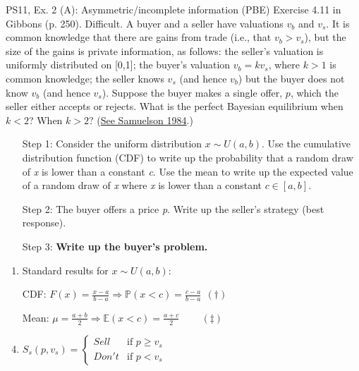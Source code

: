 \begin{frame}{PS11, Ex. 2 (A): Asymmetric/incomplete information (PBE)}
    Exercise 4.11 in Gibbons (p. 250). Difficult. A buyer and a seller have valuations $v_b$ and $v_s$. It is common knowledge that there are gains from trade (i.e., that $v_b > v_s$), but the size of the gains is private information, as follows: the seller’s valuation is uniformly distributed on [0,1]; the buyer’s valuation $v_b = kv_s$, where $k > 1$ is common knowledge; the seller knows $v_s$ (and hence $v_b$) but the buyer does not know $v_b$ (and hence $v_s$). Suppose the buyer makes a single offer, $p$, which the seller either accepts or rejects. What is the perfect Bayesian equilibrium when $k < 2$? When $k > 2$? (\href{https://www.jstor.org/stable/1911195}{See Samuelson 1984}.) \vspace{-8pt}
    \begin{multicols}{2}
      \begin{itemize}
        \item[Step 1:] Consider the uniform distribution $x\sim U(a, b)$. Use the cumulative distribution function (CDF) to write up the probability that a random draw of \textit{x} is lower than a constant \textit{c}. Use the mean to write up the expected value of a random draw of \textit{x} where \textit{x} is lower than a constant $c\in[a,b]$.
        \item[Step 2:] The buyer offers a price \textit{p}. Write up the seller's strategy (best response).
        \item[Step 3:] \textbf{Write up the buyer's problem.}
      \end{itemize}
      \vfill\null\columnbreak
      \begin{enumerate}
        \item Standard results for $x\sim U(a, b):$
        \item[CDF:] $F(x)=\frac{x-a}{b-a}\Rightarrow\mathbb{P}(x<c)=\frac{c-a}{b-a}\ \ (\dagger)$
        \item[Mean:] $\mu=\frac{a+b}{2}\Rightarrow\mathbb{E}(x<c)=\frac{a+c}{2}\quad\quad\ (\ddagger)$
        \item $S_s(p,v_s)=\left\{\begin{array}{ll}
          Sell  & \text{if }p\geq v_s \\
          Don't & \text{if }p < v_s
        \end{array}\right.$
      \end{enumerate}
      \vfill\null
    \end{multicols}
\end{frame}
